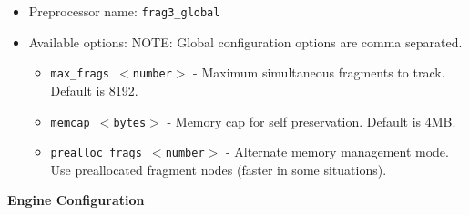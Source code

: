 \documentclass[english]{report}
\begin{document}
\begin{itemize}

\item Preprocessor name: \texttt{frag3\_global}

\item Available options: NOTE: Global configuration options are comma
separated.

\begin{itemize}

\item \texttt{max\_frags $<$number$>$} - Maximum simultaneous fragments to
track. Default is 8192.

\item \texttt{memcap $<$bytes$>$} - Memory cap for self preservation.  Default
is 4MB.  

\item \texttt{prealloc\_frags $<$number$>$} - Alternate memory management mode.
Use preallocated fragment nodes (faster in some situations).

\end{itemize}                               
\end{itemize}    
 
\textbf{Engine Configuration}
\end{document}
